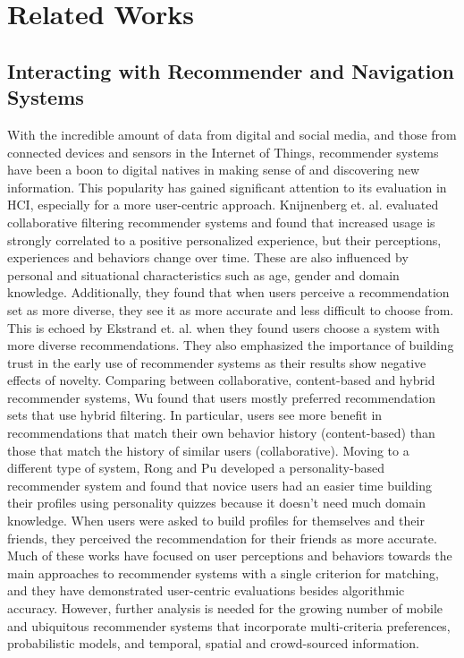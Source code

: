 
\chapter{Related Works}

\section{Interacting with Recommender and Navigation Systems}
With the incredible amount of data from digital and social media, and those from connected devices and sensors in the Internet of Things, recommender systems have been a boon to digital natives in making sense of and discovering new information. This popularity has gained significant attention to its evaluation in HCI, especially for a more user-centric approach. Knijnenberg et. al. \cite{Knijnenburg2012ExplainingSystems} evaluated collaborative filtering recommender systems and found that increased usage is strongly correlated to a positive personalized experience, but their perceptions, experiences and behaviors change over time. These are also influenced by personal and situational characteristics such as age, gender and domain knowledge. Additionally, they found that when users perceive a recommendation set as more diverse, they see it as more accurate and less difficult to choose from. This is echoed by Ekstrand et. al. \cite{Ekstrand2014UserAlgorithms} when they found users choose a system with more diverse recommendations. They also emphasized the importance of building trust in the early use of recommender systems as their results show negative effects of novelty. Comparing between collaborative, content-based and hybrid recommender systems, Wu \cite{Wu2015HybridSystems} found that users mostly preferred recommendation sets that use hybrid filtering. In particular, users see more benefit in recommendations that match their own behavior history (content-based) than those that match the history of similar users (collaborative). Moving to a different type of system, Rong and Pu \cite{Hu2010ASystems} developed a personality-based recommender system and found that novice users had an easier time building their profiles using personality quizzes because it doesn't need much domain knowledge. When users were asked to build profiles for themselves and their friends, they perceived the recommendation for their friends as more accurate. Much of these works have focused on user perceptions and behaviors towards the main approaches to recommender systems with a single criterion for matching, and they have demonstrated user-centric evaluations besides algorithmic accuracy. However, further analysis is needed for the growing number of mobile and ubiquitous recommender systems that incorporate multi-criteria preferences, probabilistic models, and temporal, spatial and crowd-sourced information.

